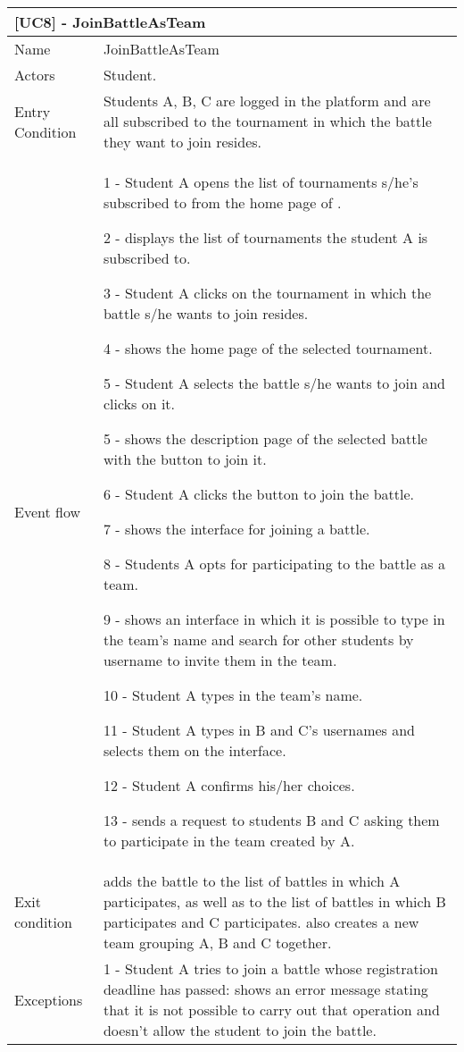   
	
	\begin{longtable}{|p{3cm}p{14cm}|}
		\multicolumn{2}{l}{\textbf{[UC8] - JoinBattleAsTeam}}\\
		\hline
		Name & JoinBattleAsTeam \\
		\hline
		Actors & Student. \\
		\hline
		Entry Condition & Students A, B, C are logged in the platform and are all subscribed to the tournament in which the battle they want to join resides.\\
		\hline
		Event flow &  
		1 - Student A opens the list of tournaments s/he's subscribed to from the home page of \app.
		
		2 - \app displays the list of tournaments the student A is subscribed to.
		
		3 - Student A clicks on the tournament in which the battle s/he wants to join resides.
		
		4 - \app shows the home page of the selected tournament.
		
		5 - Student A selects the battle s/he wants to join and clicks on it.
		
		5 - \app shows the description page of the selected battle with the button to join it.
		
		6 - Student A clicks the button to join the battle.
		
		7 - \app shows the interface for joining a battle.
		
		8 - Students A opts for participating to the battle as a team.
		
		9 - \app shows an interface in which it is possible to type in the team's name and search for other students by username to invite them in the team.
		
		10 - Student A types in the team's name.
		
		11 - Student A types in B and C's usernames and selects them on the interface.
		
		12 - Student A confirms his/her choices.
		
		13 - \app sends a request to students B and C asking them to participate in the team created by A.
		
		\\
		\hline
		Exit condition & \app adds the battle to the list of battles in which A participates, as well as to the list of battles in which B participates and C participates. \app also creates a new team grouping A, B and C together.\\
		\hline
		Exceptions & 
		1 - Student A tries to join a battle whose registration deadline has passed: \app shows an error message stating that it is not possible to carry out that operation and doesn't allow the student to join the battle.
		

\end{longtable}
